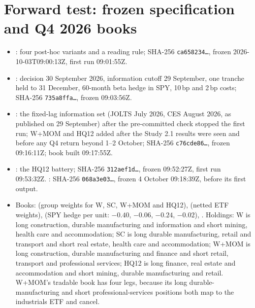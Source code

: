 \section{Forward test: frozen specification and Q4 2026 books}\label{app:forward}
\begin{itemize}
  \item {}: four post-hoc variants and a reading rule; SHA-256 \texttt{ca658234\ldots}, frozen 2026-10-03T09:00:13Z, first run 09:01:55Z. %
  \item {}: decision 30 September 2026, information cutoff 29 September, one tranche held to 31 December, 60-month beta hedge in SPY, 10\,bp and 2\,bp costs; SHA-256 \texttt{735a8ffa\ldots}, frozen 09:03:56Z. %
  \item {}: the fixed-lag information set (JOLTS July 2026, CES August 2026, as published on 29 September) after the pre-committed check stopped the first run; W+MOM and HQ12 added after the Study 2.1 results were seen and before any Q4 return beyond 1--2 October; SHA-256 \texttt{c76cde86\ldots}, frozen 09:16:11Z; book built 09:17:55Z. %
  \item {}: the HQ12 battery; SHA-256 \texttt{312aef1d\ldots}, frozen 09:52:27Z, first run 09:53:32Z. : SHA-256 \texttt{068a3e03\ldots}, frozen 4 October 09:18:39Z, before its first output. %
  \item Books:  (group weights for W, SC, W+MOM and HQ12),  (netted ETF weights),  (SPY hedge per unit: $-0.40$, $-0.06$, $-0.24$, $-0.02$), %
  . Holdings: W is long construction, durable manufacturing and information and short mining, health care and accommodation; %
  SC is long durable manufacturing, retail and transport and short real estate, health care and accommodation; W+MOM is long construction, durable manufacturing and finance and short retail, transport and professional services; %
  HQ12 is long finance, real estate and accommodation and short mining, durable manufacturing and retail. %
  W+MOM's tradable book has four legs, because its long durable-manufacturing and short professional-services positions both map to the industrials ETF and cancel. %

\end{itemize}
